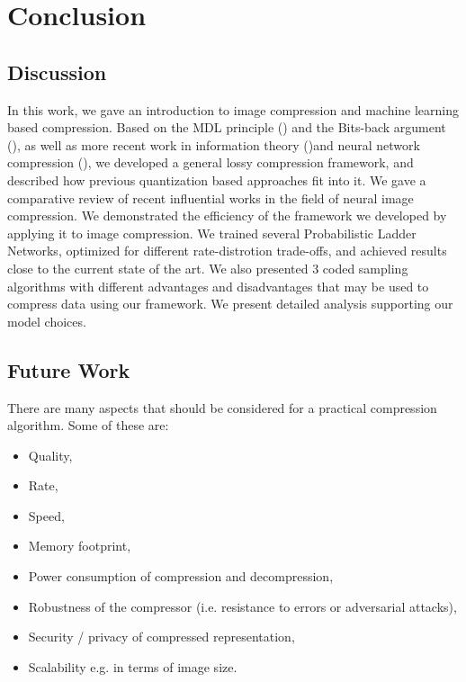 
\chapter{Conclusion}

\section{Discussion}
\par
In this work, we gave an introduction to image compression and machine learning
based compression. Based on the MDL principle (\cite{rissanen1986stochastic})
and the Bits-back argument (\cite{hinton1993keeping}), as
well as more recent work in information theory
(\cite{harsha2007communication})and neural network compression
(\cite{havasi2018minimal}),
we developed a general lossy compression framework, and described how previous
quantization based approaches fit into it. We gave a comparative review of
recent influential works in the field of neural image compression. We
demonstrated the efficiency of the framework we developed by applying it to
image compression. We trained several Probabilistic Ladder Networks, optimized
for different rate-distrotion trade-offs, and achieved results close to
the current state of the art. We also presented 3 coded sampling algorithms with
different advantages and disadvantages that may be used to compress data using
our framework. We present detailed analysis supporting our model choices.

\section{Future Work}
\par 
There are many aspects that should be considered for a practical compression
algorithm. Some of these are:
\begin{itemize}
\item Quality,
\item Rate,
\item Speed,
\item Memory footprint,
\item Power consumption of compression and decompression,
\item Robustness of the compressor (i.e. resistance to errors or adversarial attacks),
\item Security / privacy of compressed representation,
\item Scalability e.g. in terms of image size.
\end{itemize}

